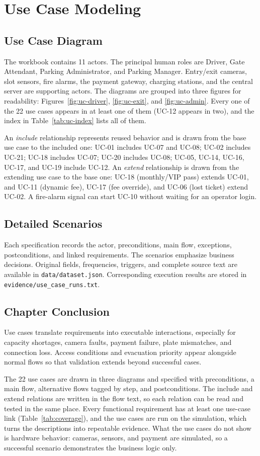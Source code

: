 \chapter{Use Case Modeling}
\section{Use Case Diagram}
The workbook contains 11 actors. The principal human roles are Driver, Gate Attendant, Parking Administrator, and Parking Manager. Entry/exit cameras, slot sensors, fire alarms, the payment gateway, charging stations, and the central server are supporting actors. The diagrams are grouped into three figures for readability: Figures~\ref{fig:uc-driver}, \ref{fig:uc-exit}, and \ref{fig:uc-admin}. Every one of the 22 use cases appears in at least one of them (UC-12 appears in two), and the index in Table~\ref{tab:uc-index} lists all of them.

An \emph{include} relationship represents reused behavior and is drawn from the base use case to the included one: UC-01 includes UC-07 and UC-08; UC-02 includes UC-21; UC-18 includes UC-07; UC-20 includes UC-08; UC-05, UC-14, UC-16, UC-17, and UC-19 include UC-12. An \emph{extend} relationship is drawn from the extending use case to the base one: UC-18 (monthly/VIP pass) extends UC-01, and UC-11 (dynamic fee), UC-17 (fee override), and UC-06 (lost ticket) extend UC-02. A fire-alarm signal can start UC-10 without waiting for an operator login.


\section{Detailed Scenarios}
Each specification records the actor, preconditions, main flow, exceptions, postconditions, and linked requirements. The scenarios emphasize business decisions. Original fields, frequencies, triggers, and complete source text are available in \texttt{data/dataset.json}. Corresponding execution results are stored in \texttt{evidence/use\_case\_runs.txt}.


\section{Chapter Conclusion}
Use cases translate requirements into executable interactions, especially for capacity shortages, camera faults, payment failure, plate mismatches, and connection loss. Access conditions and evacuation priority appear alongside normal flows so that validation extends beyond successful cases.

The 22 use cases are drawn in three diagrams and specified with preconditions, a main flow, alternative flows tagged by step, and postconditions. The include and extend relations are written in the flow text, so each relation can be read and tested in the same place. Every functional requirement has at least one use-case link (Table~\ref{tab:coverage}), and the use cases are run on the simulation, which turns the descriptions into repeatable evidence. What the use cases do not show is hardware behavior: cameras, sensors, and payment are simulated, so a successful scenario demonstrates the business logic only.
